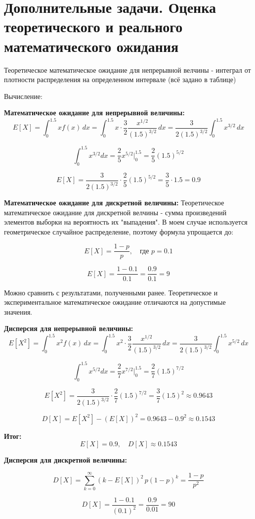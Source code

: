 \chapter{Дополнительные задачи. Оценка теоретического и реального математического ожидания}
\label{ch:chap3}

Теоретическое математическое ожидание для непрерывной велчины - интеграл от плотности распределения на определенном интервале (всё задано в таблице)

Вычисление:

\textbf{Математическое ожидание для непрерывной величины:}
\[
E[X] = \int_0^{1.5} x f(x) \, dx
= \int_0^{1.5} x \cdot \frac{3}{2} \frac{x^{1/2}}{(1.5)^{3/2}} \, dx
= \frac{3}{2 (1.5)^{3/2}} \int_0^{1.5} x^{3/2} \, dx
\]

\[
\int_0^{1.5} x^{3/2} dx = \frac{2}{5} x^{5/2} \Big|_0^{1.5} = \frac{2}{5} (1.5)^{5/2}
\]

\[
E[X] = \frac{3}{2 (1.5)^{3/2}} \cdot \frac{2}{5} (1.5)^{5/2} = \frac{3}{5} \cdot 1.5 = 0.9
\]

\textbf{Математическое ожидание для дискретной величины:}
Теоретическое математическое ожидание для дискретной велчины - сумма произведений элементов выборки на вероятность их "выпадения".
В моем случае используется геометрическое случайное распределение, поэтому формула упрощается до:

\[
E[X] = \frac{1-p}{p}, \quad \text{где } p = 0.1
\]

\[
E[X] = \frac{1 - 0.1}{0.1} = \frac{0.9}{0.1} = 9
\]


Можно сравнить с результатами, полученными ранее. Теоретическое и экспериментальное математическое ожидание отличаются на допустимые значения.


\textbf{Дисперсия для непрерывной величины:}
\[
E[X^2] = \int_0^{1.5} x^2 f(x) \, dx
= \int_0^{1.5} x^2 \cdot \frac{3}{2} \frac{x^{1/2}}{(1.5)^{3/2}} \, dx
= \frac{3}{2 (1.5)^{3/2}} \int_0^{1.5} x^{5/2} \, dx
\]

\[
\int_0^{1.5} x^{5/2} dx = \frac{2}{7} x^{7/2} \Big|_0^{1.5} = \frac{2}{7} (1.5)^{7/2}
\]

\[
E[X^2] = \frac{3}{2 (1.5)^{3/2}} \cdot \frac{2}{7} (1.5)^{7/2} = \frac{3}{7} (1.5)^2 \approx 0.9643
\]

\[
D[X] = E[X^2] - (E[X])^2 = 0.9643 - 0.9^2 \approx 0.1543
\]

\textbf{Итог:}
\[
\boxed{E[X] = 0.9, \quad D[X] \approx 0.1543}
\]

\textbf{Дисперсия для дискретной величины:}

\[
D[X] = \sum_{k=0}^{\infty} (k - E[X])^2 \, p (1-p)^k = \frac{1-p}{p^2}
\]

\[
D[X] = \frac{1-0.1}{(0.1)^2} = \frac{0.9}{0.01} = 90
\]


\endinput